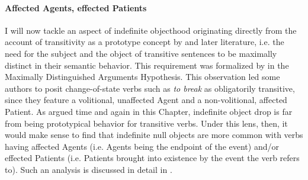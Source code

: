 \paragraph{Affected Agents, effected Patients} 

I will now tackle an aspect of indefinite objecthood originating directly from the account of transitivity as a prototype concept by \textcite{HopperThompson1980} and later literature, i.e. the need for the subject and the object of transitive sentences to be maximally distinct in their semantic behavior. This requirement was formalized by \textcite[30]{Naess2007} in the Maximally Distinguished Arguments Hypothesis. This observation led some authors to posit change-of-state verbs such as \textit{to break} as obligatorily transitive, since they feature a volitional, unaffected Agent and a non-volitional, affected Patient. As argued time and again in this Chapter, indefinite object drop is far from being prototypical behavior for transitive verbs. Under this lens, then, it would make sense to find that indefinite null objects are more common with verbs having affected Agents (i.e. Agents being the endpoint of the event) and/or effected Patients (i.e. Patients brought into existence by the event the verb refers to). Such an analysis is discussed in detail in \textcite{Naess2007}.\\
